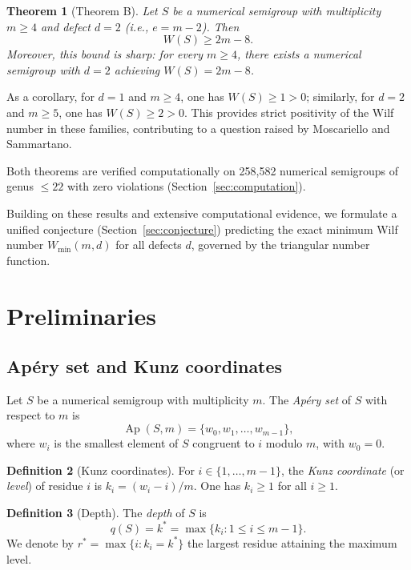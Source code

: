 \documentclass[11pt]{amsart}
\newtheorem{theorem}{Theorem}[section]
\theoremstyle{definition}
\newtheorem{definition}[theorem]{Definition}
\theoremstyle{remark}
\newcommand{\Ap}{\operatorname{Ap}}
\begin{document}
\begin{theorem}[Theorem B]\label{thm:B-intro}
Let $S$ be a numerical semigroup with multiplicity $m \ge 4$ and defect $d = 2$
(i.e., $e = m - 2$).  Then
\[
  W(S) \ge 2m - 8.
\]
Moreover, this bound is sharp: for every $m \ge 4$, there exists a
numerical semigroup with $d = 2$ achieving $W(S) = 2m - 8$.
\end{theorem}

As a corollary, for $d = 1$ and $m \ge 4$, one has $W(S) \ge 1 > 0$;
similarly, for $d = 2$ and $m \ge 5$, one has $W(S) \ge 2 > 0$.
This provides strict positivity of the Wilf number in these families,
contributing to a question raised by Moscariello and Sammartano.

Both theorems are verified computationally on 258{,}582 numerical semigroups
of genus $\le 22$ with zero violations (Section~\ref{sec:computation}).

Building on these results and extensive computational evidence, we formulate a
unified conjecture (Section~\ref{sec:conjecture}) predicting the exact minimum
Wilf number $W_{\min}(m, d)$ for all defects $d$,
governed by the triangular number function.

\section{Preliminaries}\label{sec:prelim}

\subsection{Ap\'ery set and Kunz coordinates}

Let $S$ be a numerical semigroup with multiplicity $m$.
The \emph{Ap\'ery set} of $S$ with respect to $m$ is
\[
  \Ap(S, m) = \{w_0, w_1, \ldots, w_{m-1}\},
\]
where $w_i$ is the smallest element of $S$ congruent to $i$ modulo $m$,
with $w_0 = 0$.

\begin{definition}[Kunz coordinates]\label{def:kunz}
For $i \in \{1, \ldots, m-1\}$, the \emph{Kunz coordinate} (or \emph{level})
of residue $i$ is $k_i = (w_i - i) / m$.  One has $k_i \ge 1$ for all $i \ge 1$.
\end{definition}

\begin{definition}[Depth]\label{def:depth}
The \emph{depth} of $S$ is
\[
  q(S) = k^* = \max\{k_i : 1 \le i \le m - 1\}.
\]
We denote by $r^* = \max\{i : k_i = k^*\}$ the largest residue attaining the
maximum level.
\end{definition}
\end{document}
